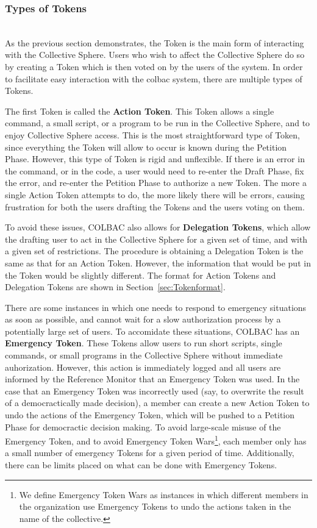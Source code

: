 \subsubsection{Types of Tokens}
\label{sec:Tokentypes}
\mbox{}\\
As the previous section demonstrates, the Token is the main form of interacting
with the Collective Sphere. Users who wish to affect the Collective Sphere do
so by creating a Token which is then voted on by the users of the system. In
order to facilitate easy interaction with the colbac system, there are multiple
types of Tokens.

The first Token is called the \textbf{Action Token}. This Token allows a single
command, a small script, or a program to be run in the Collective Sphere, and to
enjoy Collective Sphere access. This is the most straightforward type of Token,
since everything the Token will allow to occur is known during the Petition
Phase. However, this type of Token is rigid and unflexible. If there is an error
in the command, or in the code, a user would need to re-enter the Draft Phase,
fix the error, and re-enter the Petition Phase to authorize a new Token. The
more a single Action Token attempts to do, the more likely there will be errors,
causing frustration for both the users drafting the Tokens and the users voting
on them.

To avoid these issues, COLBAC also allows for \textbf{Delegation Tokens}, which
allow the drafting user to act in the Collective Sphere for a given set of time,
and with a given set of restrictions. The procedure is obtaining a Delegation
Token is the same as that for an Action Token. However, the information that
would be put in the Token would be slightly different. The format for Action
Tokens and Delegation Tokens are shown in Section~\ref{sec:Tokenformat}.

There are some instances in which one needs to respond to emergency situations
as soon as possible, and cannot wait for a slow authorization process by a
potentially large set of users. To accomidate these situations, COLBAC has an
\textbf{Emergency Token}. These Tokens allow users to run short scripts, single
commands, or small programs in the Collective Sphere without immediate
auhorization. However, this action is immediately logged and all users are
informed by the Reference Monitor that an Emergency Token was used. In the case
that an Emergency Token was incorrectly used (say, to overwrite the result of
a democractically made decision), a member can create a new Action Token to
undo the actions of the Emergency Token, which will be pushed to a Petition
Phase for democractic decision making. To avoid large-scale misuse of the
Emergency Token, and to avoid Emergency Token Wars\footnote{We define Emergency
Token Wars as instances in which different members in the organization use
Emergency Tokens to undo the actions taken in the name of the collective.},
each member only has a small number of emergency Tokens for a given period of
time. Additionally, there can be limits placed on what can be done with 
Emergency Tokens.

